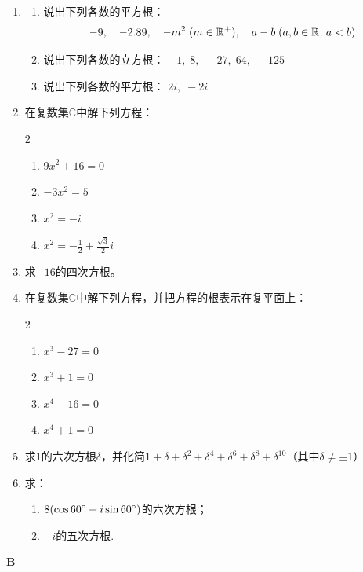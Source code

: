 \begin{enumerate}
    \item \begin{enumerate}[(1)]
        \item 说出下列各数的平方根：
        $$-9,\quad -2.89,\quad -m^2\; (m\in\mathbb{R}^+),\quad a-b\; (a,b\in\mathbb{R},\, a<b)$$
        \item 说出下列各数的立方根：
        $-1,\; 8,\; -27,\; 64,\; -125$
        \item 说出下列各数的平方根：
        $2i,\; -2i$
    \end{enumerate}
\item 在复数集$\mathbb{C}$中解下列方程：
\begin{multicols}{2}
\begin{enumerate}[(1)]
    \item $9x^2+16=0$
    \item $-3x^2=5$
    \item $x^2=-i$
    \item $x^2=-\frac{1}{2}+\frac{\sqrt{3}}{2}i$
\end{enumerate}
\end{multicols}
\item 求$-16$的四次方根。
\item 在复数集$\mathbb{C}$中解下列方程，并把方程的根表示在复平面上：
\begin{multicols}{2}
    \begin{enumerate}[(1)]
    \item $x^3-27=0$
    \item $x^3+1=0$
    \item $x^4-16=0$
    \item $x^4+1=0$
\end{enumerate}
\end{multicols}
\item 求1的六次方根$\delta$，并化简$1+\delta+\delta^2+\delta^4+\delta^6+\delta^8+\delta^{10}$（其中$\delta\ne \pm1$）

\item 求：
\begin{enumerate}[(1)]
    \item $8(\cos60^{\circ}+i\sin60^{\circ})$的六次方根；
    \item $-i$的五次方根.
\end{enumerate}
\end{enumerate}

\begin{center}
    \bfseries B
    \end{center}

